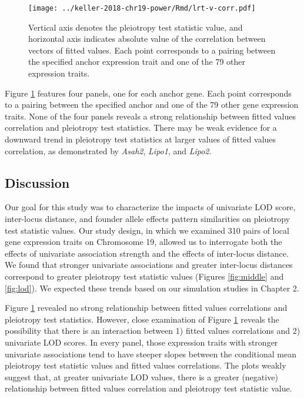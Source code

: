 \documentclass[oneside]{book}
\begin{document}

\begin{figure}
    \centering
    \texttt{[image: ../keller-2018-chr19-power/Rmd/lrt-v-corr.pdf]}
    \caption[Pleiotropy LRT vs. fitted values correlations plots reveal little evidence for a relationship.]{Vertical axis denotes the pleiotropy test statistic value, and horizontal axis indicates absolute value of the correlation between vectors of fitted values. Each point corresponds to a pairing between the specified anchor expression trait and one of the 79 other expression traits.}
    \label{fig:cor}
\end{figure}

Figure \ref{fig:cor} features four panels, one for each anchor gene. Each point corresponds to a pairing between the specified anchor and one of the 79 other gene expression traits. None of the four panels reveals a strong relationship between fitted values correlation and pleiotropy test statistics. There may be weak evidence for a downward trend in pleiotropy test statistics at larger values of fitted values correlation, as demonstrated by \emph{Asah2}, \emph{Lipo1}, and \emph{Lipo2}. 



\subsection{Discussion}

Our goal for this study was to characterize the impacts of univariate LOD score, inter-locus distance, and founder allele effects pattern similarities on pleiotropy test statistic values. Our study design, in which we examined 310 pairs of local gene expression traits on Chromosome 19, allowed us to interrogate both the effects of univariate association strength and the effects of inter-locus distance. We found that stronger univariate associations and greater inter-locus distances correspond to greater pleiotropy test statistic values (Figures \ref{fig:middle} and \ref{fig:lod}). We expected these trends based on our simulation studies in Chapter 2.

Figure \ref{fig:cor} revealed no strong relationship between fitted values correlations and pleiotropy test statistics. However, close examination of Figure \ref{fig:cor} reveals the possibility that there is an interaction between 1) fitted values correlations and 2) univariate LOD scores. In every panel, those expression traits with stronger univariate associations tend to have steeper slopes between the conditional mean pleiotropy test statistic values and fitted values correlations. The plots weakly suggest that, at greater univariate LOD values, there is a greater (negative) relationship between fitted values correlation and pleiotropy test statistic value.
\end{document}
